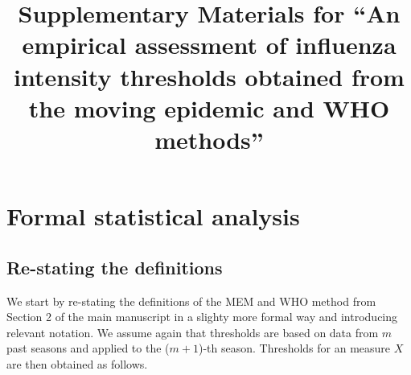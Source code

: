 \documentclass{article}
\begin{document}

\title{Supplementary Materials for ``An empirical assessment of influenza intensity thresholds obtained from the moving epidemic and WHO methods''}

\maketitle

\appendix

\section{Formal statistical analysis}

\subsection{Re-stating the definitions}
\label{sec:definitions}

We start by re-stating the definitions of the MEM and WHO method from Section 2 of the main manuscript in a slighty more formal way and introducing relevant notation. We assume again that thresholds are based on data from $m$ past seasons and applied to the ($m + 1$)-th season. Thresholds for an measure $X$ are then obtained as follows.
\end{document}
